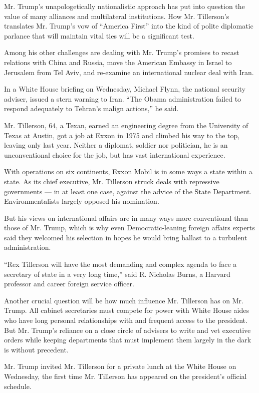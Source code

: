 Mr. Trump's unapologetically nationalistic approach has put into
question the value of many alliances and multilateral institutions. How
Mr. Tillerson's translates Mr. Trump's vow of ``America First'' into the
kind of polite diplomatic parlance that will maintain vital ties will be
a significant test.

Among his other challenges are dealing with Mr. Trump's promises to
recast relations with China and Russia, move the American Embassy in
Israel to Jerusalem from Tel Aviv, and re-examine an international
nuclear deal with Iran.

In a White House briefing on Wednesday, Michael Flynn, the national
security adviser, issued a stern warning to Iran. ``The Obama
administration failed to respond adequately to Tehran's malign
actions,'' he said.

Mr. Tillerson, 64, a Texan, earned an engineering degree from the
University of Texas at Austin, got a job at Exxon in 1975 and climbed
his way to the top, leaving only last year. Neither a diplomat, soldier
nor politician, he is an unconventional choice for the job, but has vast
international experience.

With operations on six continents, Exxon Mobil is in some ways a state
within a state. As its chief executive, Mr. Tillerson struck deals with
repressive governments --- in at least one case, against the advice of
the State Department. Environmentalists largely opposed his nomination.

But his views on international affairs are in many ways more
conventional than those of Mr. Trump, which is why even
Democratic-leaning foreign affairs experts said they welcomed his
selection in hopes he would bring ballast to a turbulent administration.

``Rex Tillerson will have the most demanding and complex agenda to face
a secretary of state in a very long time,'' said R. Nicholas Burns, a
Harvard professor and career foreign service officer.

Another crucial question will be how much influence Mr. Tillerson has on
Mr. Trump. All cabinet secretaries must compete for power with White
House aides who have long personal relationships with and frequent
access to the president. But Mr. Trump's reliance on a close circle of
advisers to write and vet executive orders while keeping departments
that must implement them largely in the dark is without precedent.

Mr. Trump invited Mr. Tillerson for a private lunch at the White House
on Wednesday, the first time Mr. Tillerson has appeared on the
president's official schedule.

